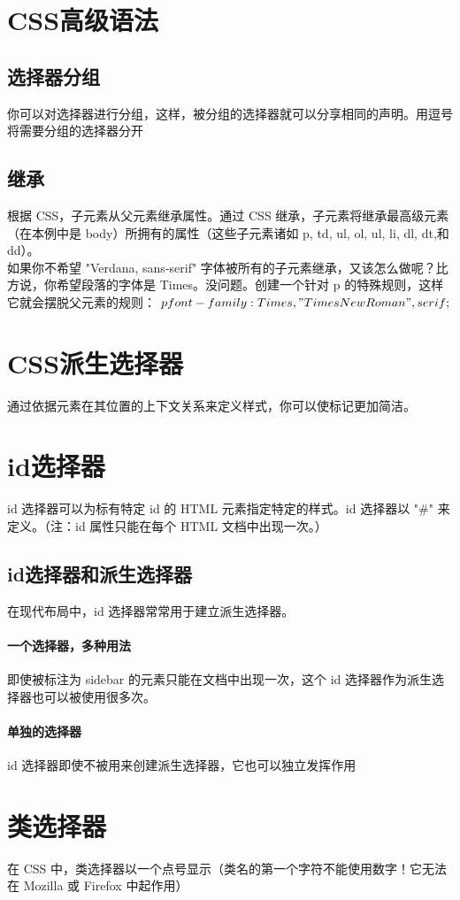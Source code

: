\documentclass[10pt,UTF8]{ctexart}
\begin{document}
\section{CSS高级语法}
\subsection{选择器分组}
你可以对选择器进行分组，这样，被分组的选择器就可以分享相同的声明。用逗号将需要分组的选择器分开
\subsection{继承}
根据 CSS，子元素从父元素继承属性。通过 CSS 继承，子元素将继承最高级元素（在本例中是 body）所拥有的属性（这些子元素诸如 p, td, ul, ol, ul, li, dl, dt,和 dd）。\\
如果你不希望 "Verdana, sans-serif" 字体被所有的子元素继承，又该怎么做呢？比方说，你希望段落的字体是 Times。没问题。创建一个针对 p 的特殊规则，这样它就会摆脱父元素的规则：
$p{font-family: Times, "Times New Roman",serif;}$
\section{CSS派生选择器}
通过依据元素在其位置的上下文关系来定义样式，你可以使标记更加简洁。
\section{id选择器}
id 选择器可以为标有特定 id 的 HTML 元素指定特定的样式。id 选择器以 "\#" 来定义。（注：id 属性只能在每个 HTML 文档中出现一次。）
\subsection{id选择器和派生选择器}
在现代布局中，id 选择器常常用于建立派生选择器。
\paragraph{一个选择器，多种用法}即使被标注为 sidebar 的元素只能在文档中出现一次，这个 id 选择器作为派生选择器也可以被使用很多次。
\paragraph{单独的选择器}id 选择器即使不被用来创建派生选择器，它也可以独立发挥作用

\section{类选择器}
在 CSS 中，类选择器以一个点号显示（类名的第一个字符不能使用数字！它无法在 Mozilla 或 Firefox 中起作用）
\end{document}
